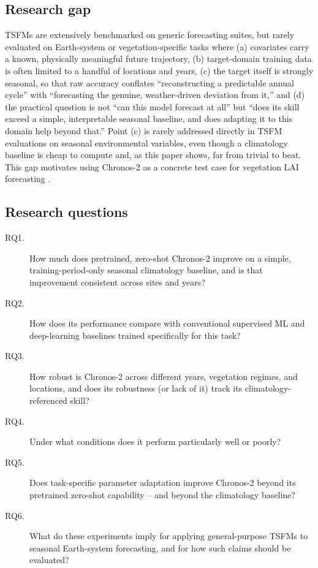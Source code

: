 \documentclass[11pt]{article}
\begin{document}
\subsection{Research gap}
\label{sec:intro-gap}

TSFMs are extensively benchmarked on generic forecasting suites, but rarely evaluated on
Earth-system or vegetation-specific tasks where (a) covariates carry a known, physically
meaningful future trajectory, (b) target-domain training data is often limited to a handful of
locations and years, (c) the target itself is strongly seasonal, so that raw accuracy conflates
``reconstructing a predictable annual cycle'' with ``forecasting the genuine, weather-driven
deviation from it,'' and (d) the practical question is not ``can this model forecast at all'' but
``does its skill exceed a simple, interpretable seasonal baseline, and does adapting it to this
domain help beyond that.'' Point (c) is rarely addressed directly in TSFM evaluations on seasonal
environmental variables, even though a climatology baseline is cheap to compute and, as this paper
shows, far from trivial to beat. This gap motivates using Chronos-2 as a concrete test case for
vegetation LAI forecasting \cite{earth_system_fm_TODO}.

\subsection{Research questions}
\label{sec:rq}

\begin{description}
  \item[RQ1.] How much does pretrained, zero-shot Chronos-2 improve on a simple, training-period-only
    seasonal climatology baseline, and is that improvement consistent across sites and years?
  \item[RQ2.] How does its performance compare with conventional supervised ML and deep-learning
    baselines trained specifically for this task?
  \item[RQ3.] How robust is Chronos-2 across different years, vegetation regimes, and locations,
    and does its robustness (or lack of it) track its climatology-referenced skill?
  \item[RQ4.] Under what conditions does it perform particularly well or poorly?
  \item[RQ5.] Does task-specific parameter adaptation improve Chronos-2 beyond its pretrained
    zero-shot capability -- and beyond the climatology baseline?
  \item[RQ6.] What do these experiments imply for applying general-purpose TSFMs to seasonal
    Earth-system forecasting, and for how such claims should be evaluated?
\end{description}
\end{document}
